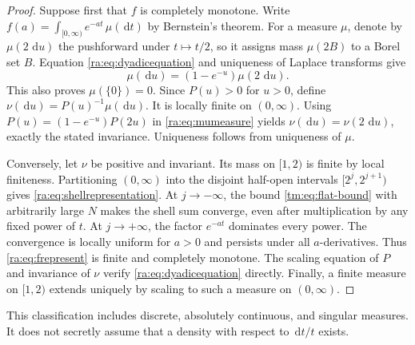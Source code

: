\documentclass[11pt,a4paper,oneside,openany]{book}
\numberwithin{equation}{chapter}
\theoremstyle{definition}
\theoremstyle{remark}
\newcommand{\dd}{\,\mathrm d}
\begin{document}
\begin{proof}
Suppose first that $f$ is completely monotone. Write
$f(a)=\int_{[0,\infty)}e^{-at}\,\mu(\dd t)$ by Bernstein's theorem.
For a measure $\mu$, denote by $\mu(2\,\dd u)$ the pushforward under
$t\mapsto t/2$, so it assigns mass $\mu(2B)$ to a Borel set $B$.
Equation \eqref{ra:eq:dyadicequation} and uniqueness of Laplace transforms give
\begin{equation}\label{ra:eq:mumeasure}
 \mu(\dd u)=(1-e^{-u})\mu(2\,\dd u).
\end{equation}
This also proves $\mu(\{0\})=0$.
Since $P(u)>0$ for $u>0$, define
$\nu(\dd u)=P(u)^{-1}\mu(\dd u)$. It is locally finite on $(0,\infty)$.
Using $P(u)=(1-e^{-u})P(2u)$ in \eqref{ra:eq:mumeasure} yields
$\nu(\dd u)=\nu(2\,\dd u)$, exactly the stated invariance.
Uniqueness follows from uniqueness of $\mu$.

Conversely, let $\nu$ be positive and invariant. Its mass on $[1,2)$ is
finite by local finiteness. Partitioning $(0,\infty)$ into the disjoint
half-open intervals $[2^j,2^{j+1})$ gives \eqref{ra:eq:shellrepresentation}.
At $j\to-\infty$, the bound \eqref{tm:eq:flat-bound} with arbitrarily large $N$
makes the shell sum converge, even after multiplication by any fixed
power of $t$. At $j\to+\infty$, the factor $e^{-at}$ dominates every
power. The convergence is locally uniform for $a>0$ and persists under
all $a$-derivatives. Thus \eqref{ra:eq:frepresent} is finite and completely
monotone. The scaling equation of $P$ and invariance of $\nu$ verify
\eqref{ra:eq:dyadicequation} directly. Finally, a finite measure on $[1,2)$
extends uniquely by scaling to such a measure on $(0,\infty)$.
\end{proof}

This classification includes discrete, absolutely continuous, and singular
measures. It does not secretly assume that a density with respect to
$\dd t/t$ exists.
\end{document}
